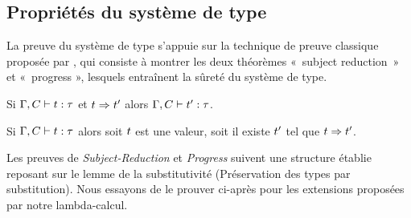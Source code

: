 \subsection{Propriétés du système de type}

La preuve du système de type s'appuie sur la technique de preuve classique
proposée par \cite{Wright92asyntactic}, qui consiste à montrer les deux
théorèmes « subject reduction » et « progress », lesquels entraînent la sûreté
du système de type.

\begin{thm}
  Si $\Gamma, C \vdash t : \tau$ et $t \Rightarrow t'$ alors 
     $\Gamma, C \vdash t' : \tau$.
\end{thm}

\begin{thm}[Progress]
  Si $\Gamma, C \vdash t : \tau$ alors soit $t$ est une valeur,
    soit il existe $t'$ tel que $t \Rightarrow t'$.
\end{thm}

Les preuves de \emph{Subject-Reduction} et \emph{Progress} suivent une
structure établie reposant sur le lemme de la substitutivité (Préservation des
types par substitution). Nous essayons de le prouver ci-après pour les
extensions proposées par notre lambda-calcul.

